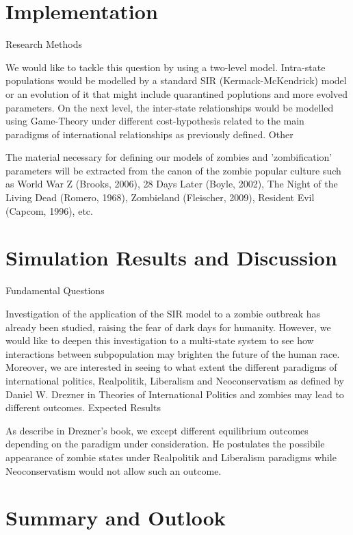 \documentclass[11pt]{article}
\begin{document}
\section{Implementation}\indent
Research Methods

We would like to tackle this question by using a two-level model. Intra-state populations would be modelled by a standard SIR (Kermack-McKendrick) model or an evolution of it that might include quarantined poplutions and more evolved parameters. On the next level, the inter-state relationships would be modelled using Game-Theory under different cost-hypothesis related to the main paradigms of international relationships as previously defined.
Other

The material necessary for defining our models of zombies and 'zombification' parameters will be extracted from the canon of the zombie popular culture such as World War Z (Brooks, 2006), 28 Days Later (Boyle, 2002), The Night of the Living Dead (Romero, 1968), Zombieland (Fleischer, 2009), Resident Evil (Capcom, 1996), etc.

\section{Simulation Results and Discussion}\indent
Fundamental Questions

Investigation of the application of the SIR model to a zombie outbreak has already been studied, raising the fear of dark days for humanity. However, we would like to deepen this investigation to a multi-state system to see how interactions between subpopulation may brighten the future of the human race. Moreover, we are interested in seeing to what extent the different paradigms of international politics, Realpolitik, Liberalism and Neoconservatism as defined by Daniel W. Drezner in Theories of International Politics and zombies may lead to different outcomes.
Expected Results

As describe in Drezner's book, we except different equilibrium outcomes depending on the paradigm under consideration. He postulates the possibile appearance of zombie states under Realpolitik and Liberalism paradigms while Neoconservatism would not allow such an outcome.

\section{Summary and Outlook}\indent
\end{document}
